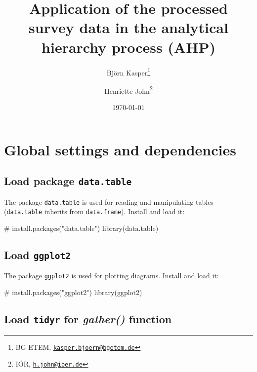 \documentclass[
]{article}
\title{Application of the processed survey data in the analytical
hierarchy process (AHP)}
\author{Björn Kasper\footnote{BG ETEM,
  \href{mailto:kasper.bjoern@bgetem.de}{\nolinkurl{kasper.bjoern@bgetem.de}}} \and Henriette
John\footnote{IÖR,
  \href{mailto:h.john@ioer.de}{\nolinkurl{h.john@ioer.de}}}}
\date{\today}
\newenvironment{Shaded}{\begin{snugshade}}{\end{snugshade}}
\newcommand{\CommentTok}[1]{\textcolor[rgb]{0.54,0.53,0.53}{#1}}
\newcommand{\FunctionTok}[1]{\textcolor[rgb]{0.39,0.29,0.61}{#1}}
\newcommand{\NormalTok}[1]{\textcolor[rgb]{0.12,0.11,0.11}{#1}}
\begin{document}
\maketitle

{
\setcounter{tocdepth}{2}
\tableofcontents
}
\hypertarget{global-settings-and-dependencies}{%
\section{Global settings and
dependencies}\label{global-settings-and-dependencies}}

\hypertarget{load-package-data.table}{%
\subsection{\texorpdfstring{Load package
\texttt{data.table}}{Load package data.table}}\label{load-package-data.table}}

The package \texttt{data.table} is used for reading and manipulating
tables (\texttt{data.table} inherits from \texttt{data.frame}). Install
and load it:

\begin{Shaded}
\begin{Highlighting}[]
\CommentTok{\# install.packages("data.table")}
\FunctionTok{library}\NormalTok{(data.table)}
\end{Highlighting}
\end{Shaded}

\hypertarget{load-ggplot2}{%
\subsection{\texorpdfstring{Load
\texttt{ggplot2}}{Load ggplot2}}\label{load-ggplot2}}

The package \texttt{ggplot2} is used for plotting diagrams. Install and
load it:

\begin{Shaded}
\begin{Highlighting}[]
\CommentTok{\# install.packages("ggplot2")}
\FunctionTok{library}\NormalTok{(ggplot2)}
\end{Highlighting}
\end{Shaded}

\hypertarget{load-tidyr-for-gather-function}{%
\subsection{\texorpdfstring{Load \texttt{tidyr} for \emph{gather()}
function}{Load tidyr for gather() function}}\label{load-tidyr-for-gather-function}}
\end{document}
